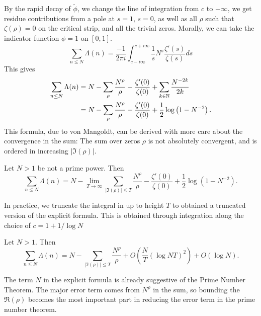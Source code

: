 By the rapid decay of $\tilde\phi$, we change the line of integration from $c$ to $-\infty$, we get residue contributions from
a pole at $s=1$, $s=0$, as well as all $\rho$ such that $\zeta(\rho)=0$ on the critical strip,
and all the trivial zeros. 
Morally, we can take the indicator function $\phi=1$ on $[0,1]$. 
\begin{equation}\label{preexplicit}
    \sum_{n\leq N} \Lambda(n)=
    \frac{-1}{2\pi i}\int_{c-i\infty}^{c+i\infty}
    \frac{1}{s} N^s \frac{\zeta'(s)}{\zeta(s)} ds
\end{equation}
This gives \begin{equation}
    \begin{split}
        \sum_{n\leq N} \Lambda(n)&= N - \sum_{\rho} \frac{N^\rho}{\rho} -
        \frac{\zeta'(0)}{\zeta(0)} + \sum_{k\in\mathbb{N}}\frac{N^{-2k}}{2k} \\
        &= N - \sum_{\rho} \frac{N^\rho}{\rho} -
        \frac{\zeta'(0)}{\zeta(0)} + \frac{1}{2}\log\left(1-N^{-2}\right). 
    \end{split}
\end{equation}
This formula, due to von Mangoldt, can be derived with more care about the convergence in the sum:
The sum over zeros $\rho$ is not absolutely convergent, and is ordered in increasing $|\Im(\rho)|$.
\begin{theorem}
    Let $N>1$ be not a prime power. Then\begin{equation}
    \sum_{n\leq N} \Lambda(n) = N - \lim_{T\to \infty}\sum_{|\Im{(\rho)}|\leq T} \frac{N^\rho}{\rho} -
    \frac{\zeta'(0)}{\zeta(0)} + \frac{1}{2}\log\left(1-N^{-2}\right). 
    \end{equation}
\end{theorem}
In practice, we truncate the integral in \label{preexplicit} up to height $T$ to obtained a truncated version of the explicit formula.
This is obtained through integration along the choice of $c=1+1/\log N$
\begin{theorem} \label{truncateexplcit}
    Let $N>1$. Then\begin{equation}
        \sum_{n\leq N} \Lambda(n) = N - \sum_{|\Im{(\rho)}|\leq T} \frac{N^\rho}{\rho} + O(\frac{N}{T}(\log NT) ^2) + O(\log N). 
        \end{equation}
\end{theorem}
The term $N$ in the explicit formula is already suggestive of the Prime Number Theorem. 
The major error term comes from $N^\rho$ in the sum, so bounding the $\Re(\rho)$ becomes the most important part in reducing the error term in the prime number theorem. 
